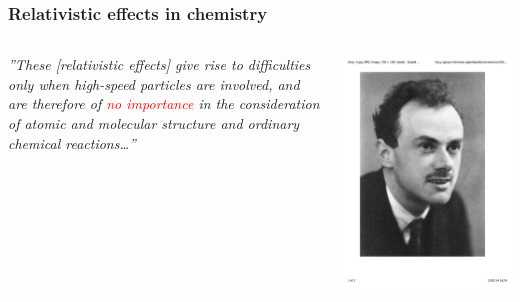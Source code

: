 \documentclass[mathserif,10pt]{beamer}
\begin{document}
\begin{frame}
    \frametitle{Relativistic effects in chemistry}
    \begin{columns}
    \begin{column}{.6\textwidth}
	\centering
	\begin{exampleblock}{\it{\small{''These [relativistic effects] give rise to difficulties 
	    only when high-speed particles are involved, and are therefore of \textcolor{red}{no 
	    importance} in the consideration of atomic and molecular structure and ordinary 
	    chemical reactions\dots''}}}
	    \vskip2mm
	    \hspace*{}
	\end{exampleblock}
    \end{column}
    \begin{column}{.4\textwidth}
	\centering
	\includegraphics[viewport = 50 200 500 800, clip, scale=0.15]{figures/dirac.pdf}
    \end{column}
    \end{columns}
\end{frame}
\end{document}
